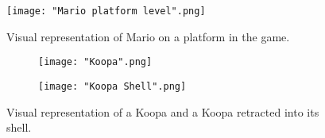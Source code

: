 \documentclass[12pt, titlepage]{article}
\begin{document}
\begin{figure}[!h]
    \centering
    \texttt{[image: "Mario platform level".png]}
    \caption{Visual representation of Mario on a platform in the game.}
\end{figure}

\begin{figure}[!h]
    \begin{subfigure}{0.25\textwidth}
        \texttt{[image: "Koopa".png]}
    \end{subfigure}
    \hfill
    \begin{subfigure}{0.25\textwidth}
        \texttt{[image: "Koopa Shell".png]}
    \end{subfigure}
    \caption{Visual representation of a Koopa and a Koopa retracted into its shell.}
\end{figure}
\end{document}
